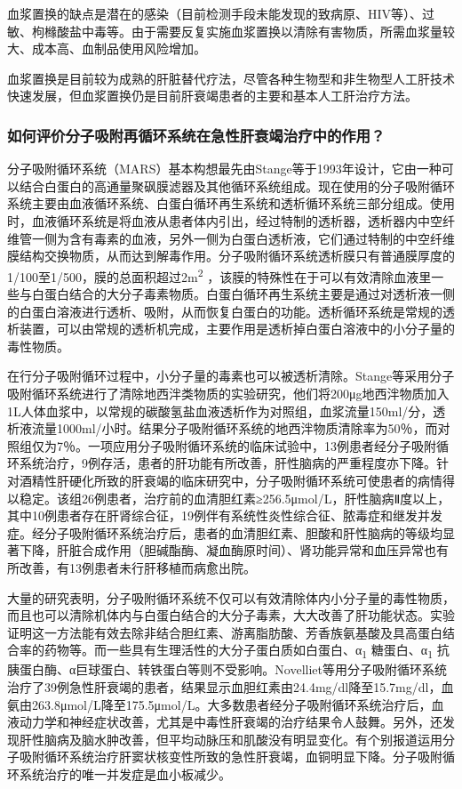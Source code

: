 血浆置换的缺点是潜在的感染（目前检测手段未能发现的致病原、HIV等）、过敏、枸橼酸盐中毒等。由于需要反复实施血浆置换以清除有害物质，所需血浆量较大、成本高、血制品使用风险增加。

血浆置换是目前较为成熟的肝脏替代疗法，尽管各种生物型和非生物型人工肝技术快速发展，但血浆置换仍是目前肝衰竭患者的主要和基本人工肝治疗方法。

\subsubsection{如何评价分子吸附再循环系统在急性肝衰竭治疗中的作用？}

分子吸附循环系统（MARS）基本构想最先由Stange等于1993年设计，它由一种可以结合白蛋白的高通量聚砜膜滤器及其他循环系统组成。现在使用的分子吸附循环系统主要由血液循环系统、白蛋白循环再生系统和透析循环系统三部分组成。使用时，血液循环系统是将血液从患者体内引出，经过特制的透析器，透析器内中空纤维管一侧为含有毒素的血液，另外一侧为白蛋白透析液，它们通过特制的中空纤维膜结构交换物质，从而达到解毒作用。分子吸附循环系统透析膜只有普通膜厚度的1/100至1/500，膜的总面积超过2m\textsuperscript{2}
，该膜的特殊性在于可以有效清除血液里一些与白蛋白结合的大分子毒素物质。白蛋白循环再生系统主要是通过对透析液一侧的白蛋白溶液进行透析、吸附，从而恢复白蛋白的功能。透析循环系统是常规的透析装置，可以由常规的透析机完成，主要作用是透析掉白蛋白溶液中的小分子量的毒性物质。

在行分子吸附循环过程中，小分子量的毒素也可以被透析清除。Stange等采用分子吸附循环系统进行了清除地西泮类物质的实验研究，他们将200μg地西泮物质加入1L人体血浆中，以常规的碳酸氢盐血液透析作为对照组，血浆流量150ml/分，透析液流量1000ml/小时。结果分子吸附循环系统的地西泮物质清除率为50％，而对照组仅为7％。一项应用分子吸附循环系统的临床试验中，13例患者经分子吸附循环系统治疗，9例存活，患者的肝功能有所改善，肝性脑病的严重程度亦下降。针对酒精性肝硬化所致的肝衰竭的临床研究中，分子吸附循环系统可使患者的病情得以稳定。该组26例患者，治疗前的血清胆红素≥256.5μmol/L，肝性脑病Ⅱ度以上，其中10例患者存在肝肾综合征，19例伴有系统性炎性综合征、脓毒症和继发并发症。经分子吸附循环系统治疗后，患者的血清胆红素、胆酸和肝性脑病的等级均显著下降，肝脏合成作用（胆碱酯酶、凝血酶原时间）、肾功能异常和血压异常也有所改善，有13例患者未行肝移植而病愈出院。

大量的研究表明，分子吸附循环系统不仅可以有效清除体内小分子量的毒性物质，而且也可以清除机体内与白蛋白结合的大分子毒素，大大改善了肝功能状态。实验证明这一方法能有效去除非结合胆红素、游离脂肪酸、芳香族氨基酸及具高蛋白结合率的药物等。而一些具有生理活性的大分子蛋白质如白蛋白、α\textsubscript{1}
糖蛋白、α\textsubscript{1}
抗胰蛋白酶、α巨球蛋白、转铁蛋白等则不受影响。Novelliet等用分子吸附循环系统治疗了39例急性肝衰竭的患者，结果显示血胆红素由24.4mg/dl降至15.7mg/dl，血氨由263.8μmol/L降至175.5μmol/L。大多数患者经分子吸附循环系统治疗后，血液动力学和神经症状改善，尤其是中毒性肝衰竭的治疗结果令人鼓舞。另外，还发现肝性脑病及脑水肿改善，但平均动脉压和肌酸没有明显变化。有个别报道运用分子吸附循环系统治疗肝窦状核变性所致的急性肝衰竭，血铜明显下降。分子吸附循环系统治疗的唯一并发症是血小板减少。

